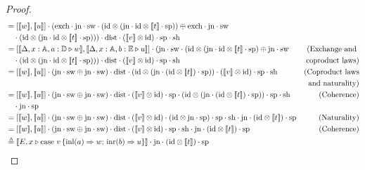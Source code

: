 \documentclass[10pt,a4paper]{amsart}
\theoremstyle{definition}
\theoremstyle{definition}
\theoremstyle{definition}
\theoremstyle{definition}
\theoremstyle{definition}
\theoremstyle{definition}
\begin{document}
\begin{proof}
\begin{align*}
  & =  \left[[\![w]\!] ,[\![u]\!] \right] \comp (\text{exch} \comp \text{jn} \comp \sw \comp (\text{id} \otimes  (\text{jn} \comp \text{id} \otimes [\![t]\!] \comp \text{sp}) ) \oplus  \text{exch} \comp \text{jn} \comp \sw  &  \\
  & \hspace{10pt}  \comp (\text{id} \otimes  (\text{jn}\comp \text{id} \otimes [\![t]\!] \comp \text{sp}) ))\comp \dist \comp ([\![v]\!] \otimes \text{id}) \comp \text{sp}\comp \text{sh}  \\
  & = [[\![ \Delta  , x:\typeA ,  a:\typeD \vljud w]\!] , [\![ \Delta  , x:\typeA ,  b:\typeE \vljud u]\!]]  \comp (  \text{jn} \comp \sw \comp (\text{id} \otimes  (\text{jn} \comp \id \otimes [\![t]\!]  \comp \text{sp})  \oplus \text{jn} \comp  \sw      & {(\text{Exchange and }}  \\
  & \hspace{10pt} \comp (\text{id} \otimes  (\text{jn} \comp \text{id} \otimes [\![t]\!] \comp \text{sp}) )  ) \comp \dist \comp ([\![v]\!] \otimes \text{id})   \comp \text{sp}\comp \text{sh}  & { \text{coproduct laws})}\\
  &= \left[[\![w ]\!] ,[\![ u]\!] \right] \comp  (\text{jn} \comp \sw \oplus \text{jn} \comp \sw)  \comp \dist \comp ( \text{id} \otimes (\text{jn} \cdot (\text{id} \otimes [\![t]\!]) \cdot \text{sp} ) ) \comp ([\![v]\!] \otimes \text{id}) \comp \text{sp} \comp \text{sh} & {(\text{Coproduct laws}}  \\
  & & {\text{and naturality}}) \\
  & =  \left[[\![w ]\!] ,[\![ u]\!] \right] \comp  (\text{jn} \comp \sw \oplus \text{jn}\comp \sw)  \comp \dist \comp  ([\![v]\!] \otimes \text{id}) \comp \text{sp} \comp ( \text{id} \otimes (\text{jn} \comp  (\text{id} \otimes [\![t]\!]) \cdot \text{sp} ) ) \comp \text{sp}\comp \text{sh}     & {(\text{Coherence})} \\
  &  \hspace{10pt}  \comp \text{jn}  \comp \text{sp} & \\
  & = \left[[\![w ]\!] ,[\![ u]\!] \right] \comp  (\text{jn} \comp \sw \oplus \text{jn} \comp \sw)  \comp \dist \comp  ([\![v]\!] \otimes \text{id})  \comp ( \id \otimes \text{jn} \comp \text{sp}) \comp \text{sp}  \comp \text{sh}    \comp \text{jn} \comp (\text{id} \otimes [\![ t ]\!] ) \comp \text{sp} & {(\text{Naturality})}   \\
  & =  [[\![w]\!], [\![u]\!]] \comp (\text{jn} \comp \sw \oplus \text{jn} \comp \sw)  \comp \dist   \comp ([\![v  ]\!] \otimes \text{id}) \comp \text{sp} \comp \text{sh} \comp \text{jn} \comp (\text{id} \otimes [\![ t ]\!] ) \comp \text{sp}  & {(\text{Coherence})}     \\ 
  & \triangleq  [\![E,  x\vljud \text{case } v\,  \{\text{inl} (a) \Rightarrow w ;\, \text{inr} (b) \Rightarrow u\}]\!] \comp \text{jn} \comp (\text{id} \otimes [\![ t ]\!] ) \comp \text{sp}
\end{align*}
\end{proof}
\end{document}

